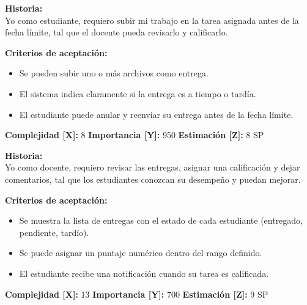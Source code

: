 \documentclass[12pt,a4paper]{article}
\begin{document}
\begin{tcolorbox}[title=\textbf{HU-14: Entregar una tarea}]
\textbf{Historia:} \\
Yo como estudiante, requiero subir mi trabajo en la tarea asignada antes de la fecha límite, tal que el docente pueda revisarlo y calificarlo.

\vspace{0.5em}
\textbf{Criterios de aceptación:}
\begin{itemize}
    \item Se pueden subir uno o más archivos como entrega.
    \item El sistema indica claramente si la entrega es a tiempo o tardía.
    \item El estudiante puede anular y reenviar su entrega antes de la fecha límite.
\end{itemize}
\textbf{Complejidad [X]:} 8 \hfill \textbf{Importancia [Y]:} 950 \hfill \textbf{Estimación [Z]:} 8 SP
\end{tcolorbox}

\vspace{0.5em}

\begin{tcolorbox}[title=\textbf{HU-15: Calificar entregas y proporcionar retroalimentación}]
\textbf{Historia:} \\
Yo como docente, requiero revisar las entregas, asignar una calificación y dejar comentarios, tal que los estudiantes conozcan su desempeño y puedan mejorar.

\vspace{0.5em}
\textbf{Criterios de aceptación:}
\begin{itemize}
    \item Se muestra la lista de entregas con el estado de cada estudiante (entregado, pendiente, tardío).
    \item Se puede asignar un puntaje numérico dentro del rango definido.
    \item El estudiante recibe una notificación cuando su tarea es calificada.
\end{itemize}
\textbf{Complejidad [X]:} 13 \hfill \textbf{Importancia [Y]:} 700 \hfill \textbf{Estimación [Z]:} 9 SP
\end{tcolorbox}

\vspace{1em}
\end{document}
